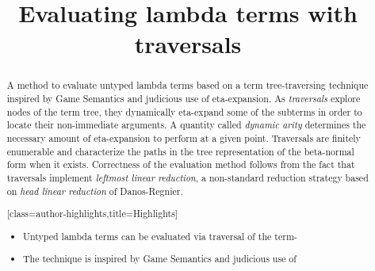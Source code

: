\documentclass[xchauthor,chkrefs,GCNS,amsmath,amsthm,rotating,leaveRGB]{tcsg}
\theoremstyle{plain}
\theoremstyle{definition}
\begin{document}
\begin{frontmatter}
\title{Evaluating lambda terms with traversals}
\begin{aug}
\author{ }
\address{%
,
,
,
, ,
%
}
\end{aug}
%
%
%
%
%
%
%
\begin{abstract}        %
A method to evaluate untyped lambda terms based on a term tree-traversing
technique inspired by Game Semantics and judicious use of eta-expansion. As
\emph{traversals} explore nodes of the term tree, they dynamically
eta-expand some of the subterms in order to locate their non-immediate
arguments. A quantity called \emph{dynamic arity} determines the necessary
amount of eta-expansion to perform at a given point. Traversals are
finitely enumerable and characterize the paths in the tree representation
of the beta-normal form when it exists. Correctness of the evaluation
method follows from the fact that traversals implement \emph{leftmost
linear reduction}, a non-standard reduction strategy based on \emph{head
linear reduction} of Danos-Regnier.
\end{abstract}
\begin{abstract}[class=author-highlights,title=Highlights]
%
\begin{itemize}
\item Untyped lambda terms can be evaluated via traversal of the
    term-
\item The technique is inspired by Game Semantics and judicious use of

\end{itemize}
\end{abstract}
\end{frontmatter}
\end{document}
